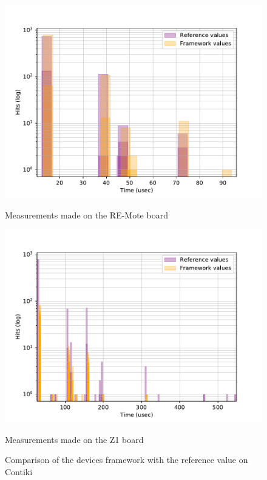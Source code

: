 \begin{figure}[!ht]
  \centering
  \includegraphics[scale=.7]{assets/comparison-devices-framework-contiki-remote.pdf}
  \caption*{Measurements made on the RE-Mote board}

  \centering
  \includegraphics[scale=.7]{assets/comparison-devices-framework-contiki-z1.pdf}
  \caption*{Measurements made on the Z1 board}
  \caption{Comparison of the devices framework with the reference value on Contiki\label{fig:devices-comparison-contiki}}
\end{figure}